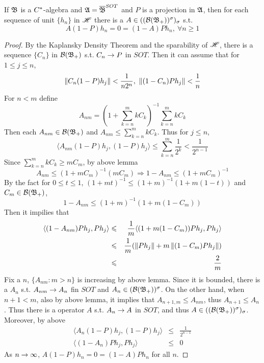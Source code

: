 \documentclass[a4paper,11pt]{report}
\begin{document}
\begin{lem}
	If $\mathfrak{B}$ is a $C^{*}$-algebra and $\mathfrak{A} = \overline{\mathfrak{B}}^{SOT}$ and $P$ is a projection in $\mathfrak{A}$, then for each sequence of unit $\{h_n\}$ in $\mathscr{H}$  there is a $A \in ((\mathcal{B}(\mathfrak{B}_+))^{\sigma})_{\sigma}$ s.t.
	\begin{equation*}
		A(1-P)h_n = 0  = (1-A)Ph_n,~ \forall  n \geqslant 1
	\end{equation*}
\end{lem}
\begin{proof}
	By the Kaplansky Density Theorem and the sparability of $\mathscr{H}$, there is a sequence $\{C_n\}$ in $\mathcal{B}(\mathfrak{B}_+)$ s.t. $C_n \rightarrow P$ in $SOT$. Then it can assume that for $1 \leqslant j \leqslant  n$,
	\begin{equation*}
		\left\lVert C_n(1-P)h_j\right\lVert < \frac{1}{n2^n},~ \left\lVert(1-C_n)Ph_j\right\lVert < \frac{1}{n}
	\end{equation*}
	For $n < m$ define
	\begin{equation*}
		A_{nm} = \left(1+ \sum_{k=n}^m kC_k \right)^{-1}\sum_{k=n}^m kC_k
	\end{equation*}
	Then each $A_{nm} \in \mathcal{B}(\mathfrak{B}_+)$ and $A_{nm} \leqslant \sum_{k=n}^m kC_k$. Thus for $j \leqslant n$,
	\begin{equation*}
		\langle A_{nm}(1-P)h_j, (1-P)h_j \rangle \leqslant \sum_{k=n}^m \frac{1}{2^k} < \frac{1}{2^{n-1}}
	\end{equation*}
	Since $\sum_{k=n}^m kC_k \geqslant mC_m$, by above lemma
	\begin{equation*}
		A_{nm} \leqslant (1+mC_m)^{-1} (mC_m) \Rightarrow 1-A_{nm} \leqslant (1+mC_m)^{-1}
	\end{equation*}
	By the fact for $0 \leqslant t \leqslant 1$, $(1+mt)^{-1} \leqslant (1+m)^{-1}(1+m(1-t))$ and $C_m \in \mathcal{B}(\mathfrak{B}_+)$, 
	\begin{equation*}
		1- A_{nm} \leqslant (1+m)^{-1}(1+m(1-C_m))
	\end{equation*}
	Then it impilies that
	\begin{eqnarray*}
		\langle (1-A_{nm})Ph_j,Ph_j \rangle &\leqslant& \frac{1}{m} \langle (1+m(1-C_m))Ph_j,Ph_j \rangle \\
		&\leqslant& \frac{1}{m} (\left\lVert Ph_j\right\lVert+m\left\lVert(1-C_m)Ph_j\right\lVert) \\
		&\leqslant& \frac{2}{m}
	\end{eqnarray*}
	Fix a $n$, $\{A_{nm} \colon m > n\}$ is increasing by above lemma. Since it is bounded, there is a $A_n$  s.t. $A_{nm} \rightarrow A_n$ fin $SOT$ and $A_n \in (\mathcal{B}(\mathfrak{B}_+))^{\sigma}$. On the other hand, when $n+1 < m$, also by above lemma, it implies that $A_{n+1,m} \leqslant A_{nm}$, thus $A_{n+1} \leqslant A_n$. Thus there is a operator $A$ s.t. $A_n \rightarrow A$ in $SOT$, and thus $A \in ((\mathcal{B}(\mathfrak{B}_+))^{\sigma})_{\sigma}$. Moreover, by above
	\begin{eqnarray*}
		\langle A_n(1-P)h_j, (1-P)h_j \rangle &\leqslant& \frac{1}{2^{n-1}} \\
		\langle (1-A_n)Ph_j,Ph_j \rangle &\leqslant& 0
	\end{eqnarray*}
	As $n \rightarrow \infty$, $A(1-P)h_n = 0  = (1-A)Ph_n$ for all $n$.
\end{proof}
\end{document}
